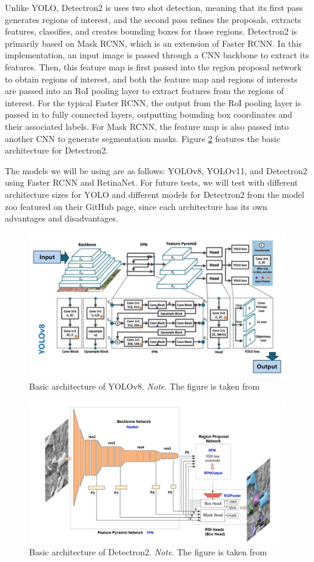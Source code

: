 \documentclass[stu,12pt,floatsintext]{apa7}
\begin{document}
Unlike YOLO, Detectron2 is uses two shot detection, meaning that its first pass generates regions of interest, and the second pass refines the proposals, extracts features, classifies, and creates bounding boxes for those regions. Detectron2 is primarily based on Mask RCNN, which is an extension of Faster RCNN. In this implementation, an input image is passed through a CNN backbone to extract its features. Then, this feature map is first passed into the region proposal network to obtain regions of interest, and both the feature map and regions of interests are passed into an RoI pooling layer to extract features from the regions of interest. For the typical Faster RCNN, the output from the RoI pooling layer is passed in to fully connected layers, outputting bounding box coordinates and their associated labels. For Mask RCNN, the feature map is also passed into another CNN to generate segmentation masks. Figure \ref{fig:Detectron2-architecture} features the basic architecture for Detectron2.


The models we will be using are as follows: YOLOv8, YOLOv11, and Detectron2 using Faster RCNN and RetinaNet. For future tests, we will test with different architecture sizes for YOLO and different models for Detectron2 from the model zoo featured on their GitHub page, since each architecture has its own advantages and disadvantages.

\begin{figure}[!htb]
	\centering
	\includegraphics[width=0.75\linewidth]{images/YOLOv8_architecture.png}
	\caption{Basic architecture of YOLOv8.
		\textit{Note}. The figure is taken from \textcite{sapkota_comparing_2024}}
	\label{fig:YOLOv8-architecture}
\end{figure}

\begin{figure}[!htb]
	\centering
	\includegraphics[width=0.75\linewidth]{images/Detectron2_architecture.png}
	\caption{Basic architecture of Detectron2. \textit{Note}. The figure is taken from \textcite{ackermann_automated_2022}}
	\label{fig:Detectron2-architecture}
\end{figure}
\end{document}
